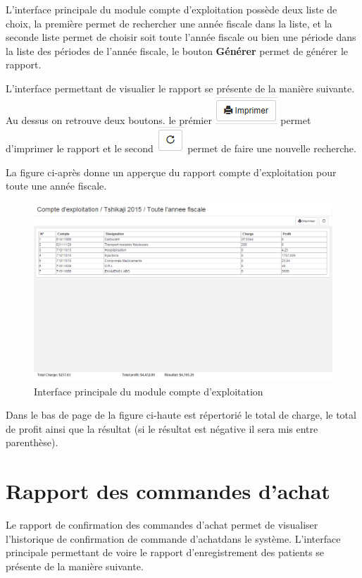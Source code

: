 \documentclass[12pt,a4paper]{report}
\begin{document}
L'interface principale du module compte d'exploitation possède deux liste de choix, la première permet de rechercher une année fiscale dans la liste, et la seconde liste permet de choisir soit toute l'année fiscale ou bien une période dans la liste des périodes de l'année fiscale, le bouton \textbf{Générer} permet de générer le rapport.

L'interface permettant de visualier le rapport se présente de la manière suivante. Au dessus on retrouve deux boutons. le prémier 
\includegraphics[scale=0.7]{pic/Print.png} permet d'imprimer le rapport et le second \includegraphics[scale=0.7]{pic/refresh.png} permet de faire une nouvelle recherche.

La figure ci-après donne un apperçue du rapport compte d'exploitation pour toute une année fiscale.

\begin{figure}[h]
\begin{center}
\includegraphics[width=12cm]{pic/ComptExploitaApp.png}
\end{center}
\caption{Interface principale du module compte d'exploitation}
\label{Interface principale du module compte d'exploitation}
\end{figure}

Dans le bas de page de la figure ci-haute est répertorié le total de charge, le total de profit ainsi que la résultat (si le résultat est négative il sera mis entre parenthèse).

\newpage
\section{Rapport des commandes d'achat}
Le rapport de confirmation des commandes d'achat permet de visualiser l'historique de confirmation de commande d'achatdans le système. L'interface principale permettant de voire le rapport d'enregistrement des patients se présente de la manière suivante. 
\end{document}

